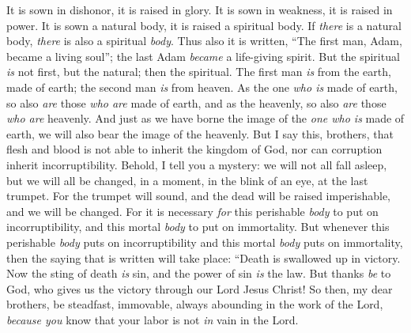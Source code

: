 \begin{biblechapter}
\verse It is sown in dishonor, it is raised in glory. It is sown in weakness, it is raised in power.
\verse It is sown a natural body, it is raised a spiritual body. If \textit{there} is a natural body, \textit{there} is also a spiritual \textit{body}.
\verse Thus also it is written, “The first man, Adam, became a living soul”; the last Adam \textit{became} a life-giving spirit.
\verse But the spiritual \textit{is} not first, but the natural; then the spiritual.
\verse The first man \textit{is} from the earth, made of earth; the second man \textit{is} from heaven.
\verse As the one \textit{who is} made of earth, so also \textit{are} those \textit{who are} made of earth, and as the heavenly, so also \textit{are} those \textit{who are} heavenly.
\verse And just as we have borne the image of the \textit{one who is} made of earth, we will also bear the image of the heavenly.
\verse But I say this, brothers, that flesh and blood is not able to inherit the kingdom of God, nor can corruption inherit incorruptibility.
\verse Behold, I tell you a mystery: we will not all fall asleep, but we will all be changed,
\verse in a moment, in the blink of an eye, at the last trumpet. For the trumpet will sound, and the dead will be raised imperishable, and we will be changed.
\verse For it is necessary \textit{for} this perishable \textit{body} to put on incorruptibility, and this mortal \textit{body} to put on immortality.
\verse But whenever this perishable \textit{body} puts on incorruptibility and this mortal \textit{body} puts on immortality, then the saying that is written will take place:
\verse “Death is swallowed up in victory.
\verse Now the sting of death \textit{is} sin, and the power of sin \textit{is} the law.
\verse But thanks \textit{be} to God, who gives us the victory through our Lord Jesus Christ!
\verse So then, my dear brothers, be steadfast, immovable, always abounding in the work of the Lord, \textit{because you} know that your labor is not \textit{in} vain in the Lord.
\end{biblechapter}

